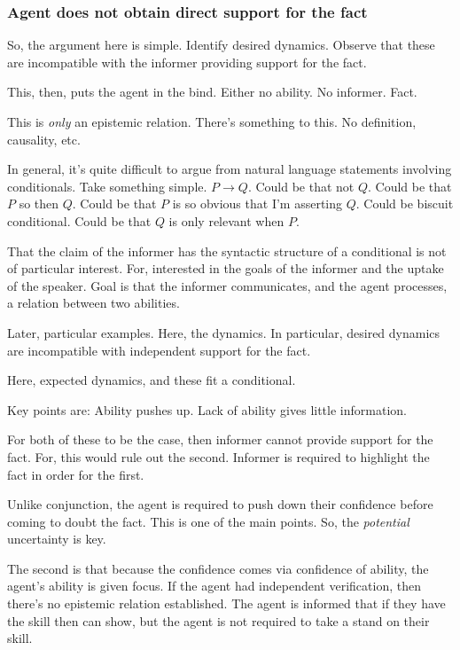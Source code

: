 \documentclass[10pt]{article}
\begin{document}
\subsubsection{Agent does not obtain direct support for the fact}
\label{sec:agent-does-not}

So, the argument here is simple.
Identify desired dynamics.
Observe that these are incompatible with the informer providing support for the fact.

This, then, puts the agent in the bind.
Either no ability.
No informer.
Fact.

This is \emph{only} an epistemic relation.
There's something to this.
No definition, causality, etc.

In general, it's quite difficult to argue from natural language statements involving conditionals.
Take something simple.
\(P \rightarrow Q\).
Could be that not \(Q\).
Could be that \(P\) so then \(Q\).
Could be that \(P\) is so obvious that I'm asserting \(Q\).
Could be biscuit conditional.
Could be that \(Q\) is only relevant when \(P\).

That the claim of the informer has the syntactic structure of a conditional is not of particular interest.
For, interested in the goals of the informer and the uptake of the speaker.
Goal is that the informer communicates, and the agent processes, a relation between two abilities.

Later, particular examples.
Here, the dynamics.
In particular, desired dynamics are incompatible with independent support for the fact.

Here, expected dynamics, and these fit a conditional.

Key points are:
Ability pushes up.
Lack of ability gives little information.

For both of these to be the case, then informer cannot provide support for the fact.
For, this would rule out the second.
Informer is required to highlight the fact in order for the first.

Unlike conjunction, the agent is required to push down their confidence before coming to doubt the fact.
This is one of the main points.
So, the \emph{potential} uncertainty is key.

The second is that because the confidence comes via confidence of ability, the agent's ability is given focus.
If the agent had independent verification, then there's no epistemic relation established.
The agent is informed that if they have the skill then can show, but the agent is not required to take a stand on their skill.
\end{document}
